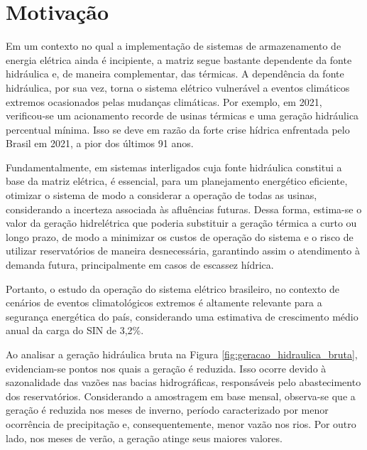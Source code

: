 \begin{figure}[!ht]
	{}
	{}
\end{figure}

\section{Motivação}
Em um contexto no qual a implementação de sistemas de armazenamento de energia elétrica ainda é incipiente,
a matriz segue bastante dependente da fonte hidráulica e, de maneira complementar, das térmicas. A dependência da fonte
hidráulica, por sua vez, torna o sistema elétrico vulnerável a eventos climáticos extremos ocasionados pelas mudanças
climáticas. Por exemplo, em 2021, verificou-se um acionamento recorde de usinas térmicas e uma geração hidráulica 
percentual mínima. Isso se deve em razão da forte crise hídrica enfrentada pelo Brasil em 2021, a pior dos últimos 91 
anos. \cite{Soares2023}

\begin{figure}[!ht]
	{}
	{}
\end{figure}

Fundamentalmente, em sistemas interligados cuja fonte hidráulica constitui a base da matriz elétrica, é essencial, 
para um planejamento energético eficiente, otimizar o sistema de modo a considerar a operação de todas as usinas, 
considerando a incerteza associada às afluências futuras. Dessa forma, estima-se o valor da geração hidrelétrica que 
poderia substituir a geração térmica a curto ou longo prazo, de modo a minimizar os custos de operação do sistema e o 
risco de utilizar reservatórios de maneira desnecessária, garantindo assim o atendimento à demanda futura, 
principalmente em casos de escassez hídrica.

Portanto, o estudo da operação do sistema elétrico brasileiro, no contexto de cenários de eventos
climatológicos extremos é altamente relevante para a segurança energética do país, considerando uma estimativa de 
crescimento médio anual da carga do SIN de 3,2\%. \cite{pen2024}

Ao analisar a geração hidráulica bruta na Figura \ref{fig:geracao_hidraulica_bruta}, evidenciam-se pontos nos 
quais a geração é reduzida. Isso ocorre devido à sazonalidade das vazões nas bacias hidrográficas, responsáveis pelo 
abastecimento dos reservatórios. Considerando a amostragem em base mensal, observa-se que a geração é reduzida nos meses
de inverno, período caracterizado por menor ocorrência de precipitação e, consequentemente, menor vazão nos rios. Por
outro lado, nos meses de verão, a geração atinge seus maiores valores.

